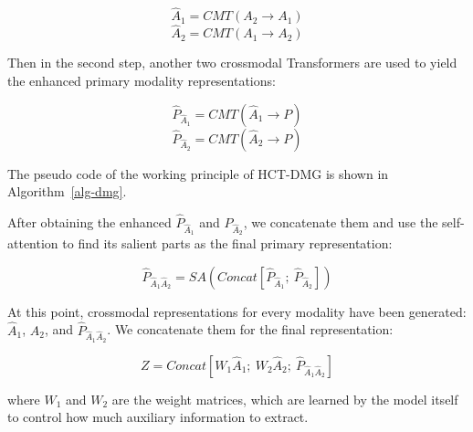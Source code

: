 \documentclass[11pt,a4paper]{article}
\begin{document}
\begin{small}
\begin{equation}
    \hat{A}_1=CMT(A_2\rightarrow{A_1})
\end{equation}
\begin{equation}
    \hat{A}_2=CMT(A_1\rightarrow{A_2})
\end{equation}
\end{small}

Then in the second step, another two crossmodal Transformers are used to yield the enhanced primary modality representations:

\begin{small}
\begin{equation}
    \hat{P}_{\hat{A}_1}=CMT(\hat{A}_1\rightarrow{P})
\end{equation}
\begin{equation}
    \hat{P}_{\hat{A}_2}=CMT(\hat{A}_2\rightarrow{P})
\end{equation}
\end{small}

The pseudo code of the working principle of HCT-DMG is shown in Algorithm~\ref{alg-dmg}.

After obtaining the enhanced $\hat{P}_{\hat{A}_1}$ and $\hat{P}_{\hat{A}_2}$, we concatenate them and use the self-attention to find its salient parts as the final primary representation:

\begin{small}
\begin{equation}
\hat{P}_{\hat{A}_1\hat{A}_2}=SA(Concat\left[\hat{P}_{\hat{A}_1};\ \hat{P}_{\hat{A}_2}\right])
\end{equation}
\end{small}

At this point, crossmodal representations for every modality have been generated: $\hat{A}_1$, $\hat{A}_2$, and $\hat{P}_{\hat{A}_1\hat{A}_2}$. We concatenate them for the final representation:

\begin{small}
\begin{equation}
Z=Concat\left[W_{1}\hat{A}_1;\ W_{2}\hat{A}_2;\ \hat{P}_{\hat{A}_1\hat{A}_2}\right]
\end{equation}
\end{small}

where $W_{1}$ and $W_{2}$ are the weight matrices, which are learned by the model itself to control how much auxiliary information to extract.
\end{document}
